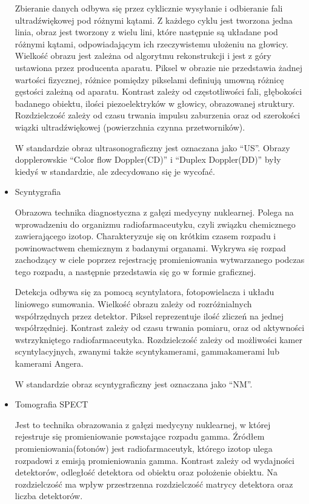\begin{itemize}
          Zbieranie danych odbywa się przez cyklicznie wysyłanie i odbieranie fali ultradźwiękowej pod różnymi kątami.
          Z każdego cyklu jest tworzona jedna linia, obraz jest tworzony z wielu lini, które następnie są układane pod różnymi kątami, odpowiadającym ich rzeczywistemu ułożeniu na głowicy.
          Wielkość obrazu jest zależna od algorytmu rekonstrukcji i jest z góry ustawiona przez producenta aparatu.
          Piksel w obrazie nie przedstawia żadnej wartości fizycznej, różnice pomiędzy pikselami definiują umowną różnicę gęstości zależną od aparatu.
          Kontrast zależy od częstotliwości fali, głębokości badanego obiektu, ilości piezoelektryków w głowicy, obrazowanej struktury.
          Rozdzielczość zależy od czasu trwania impulsu zaburzenia oraz od szerokości wiązki ultradźwiękowej (powierzchnia czynna przetworników).

          W standardzie \DICOM obraz ultrasonograficzny jest oznaczana jako \enquote{US}.
          Obrazy dopplerowskie \enquote{Color flow Doppler(CD)} i \enquote{Duplex Doppler(DD)} były kiedyś w standardzie, ale zdecydowano się je wycofać.

    \item Scyntygrafia

          Obrazowa technika diagnostyczna z gałęzi medycyny nuklearnej.
          Polega na wprowadzeniu do organizmu radiofarmaceutyku, czyli związku chemicznego zawierającego izotop.
          Charakteryzuje się on krótkim czasem rozpadu i powinowactwem chemicznym z badanymi organami.
          Wykrywa się rozpad zachodzący w ciele poprzez rejestrację promieniowania wytwarzanego podczas tego rozpadu, a następnie przedstawia się go w formie graficznej.

          Detekcja odbywa się za pomocą scyntylatora, fotopowielacza i układu liniowego sumowania.
          Wielkość obrazu zależy od rozróżnialnych współrzędnych przez detektor.
          Piksel reprezentuje ilość zliczeń na jednej współrzędniej.
          Kontrast zależy od czasu trwania pomiaru, oraz od aktywności wstrzykniętego radiofarmaceutyka.
          Rozdzielczość zależy od możliwości kamer scyntylacyjnych, zwanymi także scyntykamerami, gammakamerami lub kamerami Angera.

          W standardzie \DICOM obraz scyntygraficzny jest oznaczana jako \enquote{NM}.

    \item Tomografia SPECT

          Jest to technika obrazowania  z gałęzi medycyny nuklearnej, w której rejestruje się promieniowanie powstające rozpadu gamma.
          Źródłem promieniowania(fotonów) jest radiofarmaceutyk, którego izotop ulega rozpadowi z emisją promieniowania gamma.
          Kontrast zależy od wydajności detektorów, odległość detektora od obiektu oraz położenie obiektu.
          Na rozdzielczość ma wpływ przestrzenna rozdzielczość matrycy detektora oraz liczba detektorów.


\end{itemize}
